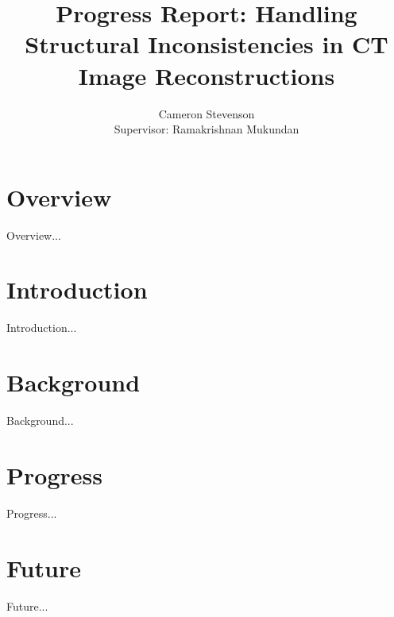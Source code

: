 \documentclass[12pt]{article}
\title{Progress Report: Handling Structural Inconsistencies in CT Image Reconstructions}
\author{Cameron Stevenson\\[1cm]{\small Supervisor: Ramakrishnan Mukundan}}
\begin{document}
\maketitle

\section{Overview}

Overview...

\section{Introduction}

Introduction...

\section{Background}

Background...

\section{Progress}

Progress...

\section{Future}

Future...

\pagebreak


\end{document}
